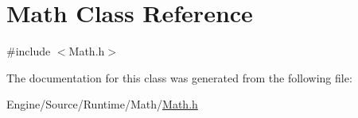 \hypertarget{class_math}{}\section{Math Class Reference}
\label{class_math}


{\ttfamily \#include $<$Math.\+h$>$}



The documentation for this class was generated from the following file\+:\begin{DoxyCompactItemize}
\item 
Engine/\+Source/\+Runtime/\+Math/\mbox{\hyperlink{_math_8h}{Math.\+h}}\end{DoxyCompactItemize}
